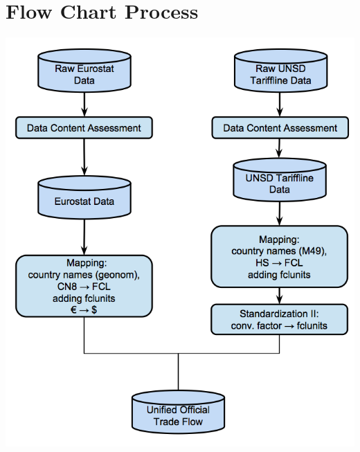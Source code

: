 \documentclass[nojss]{jss}\usepackage[]{graphicx}\usepackage[]{color}
\begin{document}
\newpage
\section{Flow Chart Process}
\begin{center}\includegraphics[scale = 0.01]{"trade_1"}\end{center}
\newpage
\end{document}
